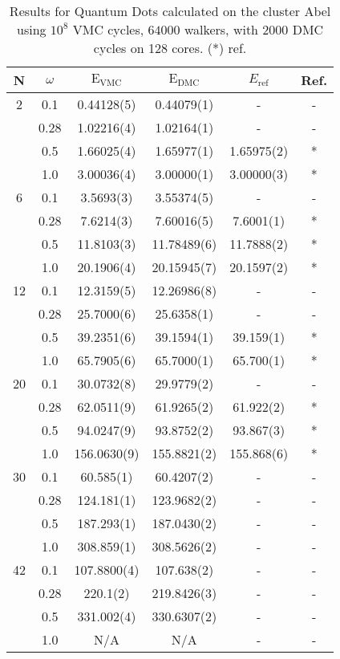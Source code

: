 \begin{table}
\begin{center}
\begin{tabular}{cc|cccc}
    N     & $\omega$ & $\mathrm{E_{VMC}}$ & $\mathrm{E_{DMC}}$ & $E_\mathrm{ref}$ & Ref.\\
\hline\hline
    2     &   0.1    & 0.44128(5) & 0.44079(1)     & - & -\\
          &   0.28   & 1.02216(4) & 1.02164(1)     & - & -\\
          &   0.5    & 1.66025(4) & 1.65977(1)     & 1.65975(2) & *\\
          &   1.0    & 3.00036(4) & 3.00000(1)     & 3.00000(3) & *\\
\hline        
    6     &   0.1    & 3.5693(3)   & 3.55374(5)    & - & - \\
          &   0.28   & 7.6214(3)   & 7.60016(5)    & 7.6001(1) & *\\ 
          &   0.5    & 11.8103(3)  & 11.78489(6)   & 11.7888(2) & *\\
          &   1.0    & 20.1906(4)  & 20.15945(7)   & 20.1597(2) & * \\
\hline
    12    &   0.1    & 12.3159(5)  & 12.26986(8)  & - & -\\
          &   0.28   & 25.7000(6)  & 25.6358(1)   & - & -\\
          &   0.5    & 39.2351(6)  & 39.1594(1)   & 39.159(1) & *\\
          &   1.0    & 65.7905(6)  & 65.7000(1)   & 65.700(1) & *\\
\hline
    20    &   0.1    & 30.0732(8)  & 29.9779(2)  & - & - \\
          &   0.28   & 62.0511(9)  & 61.9265(2)  & 61.922(2) & *\\
          &   0.5    & 94.0247(9)  & 93.8752(2)  & 93.867(3) & * \\
          &   1.0    & 156.0630(9) & 155.8821(2) & 155.868(6) & *\\
\hline
    30    &   0.1    & 60.585(1)   & 60.4207(2)  & - & - \\
          &   0.28   & 124.181(1)  & 123.9682(2) & - & - \\
          &   0.5    & 187.293(1)  & 187.0430(2) & - & - \\
          &   1.0    & 308.859(1)  & 308.5626(2) & - & - \\
\hline
    42    &   0.1    &  107.8800(4)  & 107.638(2)   & - & - \\
          &   0.28   &  220.1(2)     & 219.8426(3)  & - & - \\
          &   0.5    & 331.002(4)    & 330.6307(2)  & - & - \\
          &   1.0    & N/A           &  N/A         & - & - \\

\end{tabular}
\caption{Results for Quantum Dots calculated on the cluster Abel using $10^8$ VMC cycles, $64000$ walkers, with $2000$ DMC cycles on 128 cores. (*) ref. \cite{MagnusArticle}}
\end{center}
\end{table}


\cite{inf3331}